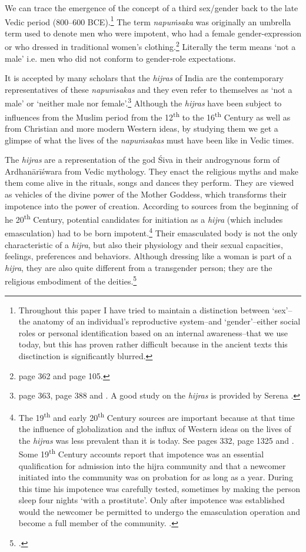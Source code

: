 We can trace the emergence of the concept of a third sex/gender back to the late Vedic period (800–600 BCE).\footnote{Throughout this paper I have tried to maintain a distinction between `sex'--the anatomy of an individual's reproductive system--and `gender'--either social roles or personal identification based on an internal awareness--that we use today, but this has proven rather difficult because in the ancient texts this disctinction is significantly blurred.} The term {\em napuṁsaka} was originally an umbrella term used to denote men who were impotent, who had a female gender-expression or who dressed in traditional women's clothing.\footnote{\cite{zwilling} page 362 and \cite{zwilling2000} page 105.} Literally the term means `not a male' i.e. men who did not conform to gender-role expectations.

It is accepted by many scholars that the {\em hijras} of India are the contemporary representatives of these {\em napuṁsakas} and they even refer to themselves as `not a male' or `neither male nor female'.\footnote{\cite{zwilling} page 363, \cite{goldman} page 388 and \cite{wendy}. A good study on the {\em hijras} is provided by Serena \cite{nanda}.} Although the {\em hijras} have been subject to influences from the Muslim period from the 12\textsuperscript{th} to the 16\textsuperscript{th} Century as well as from Christian and more modern Western ideas, by studying them we get a glimpse of what the lives of the {\em napuṁsakas} must have been like in Vedic times. 

The {\em hijras} are a representation of the god Śiva in their androgynous form of Ardhanārīśwara from Vedic mythology. They enact the religious myths and make them come alive in the rituals, songs and dances they perform. They are viewed as vehicles of the divine power of the Mother Goddess, which transforms their impotence into the power of creation. According to sources from the beginning of he 20\textsuperscript{th} Century, potential candidates for initiation as a {\em hijra} (which includes emasculation) had to be born impotent.\footnote{The 19\textsuperscript{th} and early 20\textsuperscript{th} Century sources are important because at that time the influence of globalization and the influx of Western ideas on the lives of the {\em hijras} was less prevalent than it is today. See \cite{ibbetson} pages 332, \cite{shah} page 1325 and \cite{bhimbhai}. Some 19\textsuperscript{th} Century accounts report that impotence was an essential qualification for admission into the hijra community and that a newcomer initiated into the community was on probation for as long as a year. During this time his impotence was carefully tested, sometimes by making the person sleep four nights `with a prostitute'. Only after impotence was established would the newcomer be permitted to undergo the emasculation operation and become a full member of the community. \cite{preston}.} Their emasculated body is not the only characteristic of a {\em hijra}, but also their physiology and their sexual capacities, feelings, preferences and behaviors. Although dressing like a woman is part of a {\em hijra}, they are also quite different from a transgender person; they are the religious embodiment of the deities.\footnote{\cite{nanda}.}

